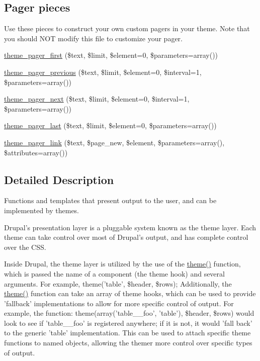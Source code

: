 \subsection*{Pager pieces}
Use these pieces to construct your own custom pagers in your theme. Note that you should NOT modify this file to customize your pager. \begin{CompactItemize}
\item 
\hyperlink{group__themeable_gbbe311616a2243c759c81e3b87ef06bf}{theme\_\-pager\_\-first} (\$text, \$limit, \$element=0, \$parameters=array())
\item 
\hyperlink{group__themeable_gd41c6c0b85a0a041610f9310fd1e39fd}{theme\_\-pager\_\-previous} (\$text, \$limit, \$element=0, \$interval=1, \$parameters=array())
\item 
\hyperlink{group__themeable_g69523320b2d45d957066b2428a19f5fa}{theme\_\-pager\_\-next} (\$text, \$limit, \$element=0, \$interval=1, \$parameters=array())
\item 
\hyperlink{group__themeable_g311db2dbb5acbda9d0938f28f161c9a8}{theme\_\-pager\_\-last} (\$text, \$limit, \$element=0, \$parameters=array())
\item 
\hyperlink{group__themeable_gecd911fe0400d240d1b93298cb83f07e}{theme\_\-pager\_\-link} (\$text, \$page\_\-new, \$element, \$parameters=array(), \$attributes=array())
\end{CompactItemize}


\subsection{Detailed Description}
Functions and templates that present output to the user, and can be implemented by themes.

Drupal's presentation layer is a pluggable system known as the theme layer. Each theme can take control over most of Drupal's output, and has complete control over the CSS.

Inside Drupal, the theme layer is utilized by the use of the \hyperlink{includes_2theme_8inc_0512a0a56fd1e056cb48bcb694fa8b12}{theme()} function, which is passed the name of a component (the theme hook) and several arguments. For example, theme('table', \$header, \$rows); Additionally, the \hyperlink{includes_2theme_8inc_0512a0a56fd1e056cb48bcb694fa8b12}{theme()} function can take an array of theme hooks, which can be used to provide 'fallback' implementations to allow for more specific control of output. For example, the function: theme(array('table\_\-\_\-foo', 'table'), \$header, \$rows) would look to see if 'table\_\-\_\-foo' is registered anywhere; if it is not, it would 'fall back' to the generic 'table' implementation. This can be used to attach specific theme functions to named objects, allowing the themer more control over specific types of output.

